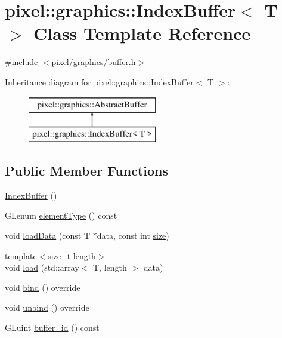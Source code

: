 \hypertarget{classpixel_1_1graphics_1_1_index_buffer}{}\section{pixel\+:\+:graphics\+:\+:Index\+Buffer$<$ T $>$ Class Template Reference}
\label{classpixel_1_1graphics_1_1_index_buffer}


{\ttfamily \#include $<$pixel/graphics/buffer.\+h$>$}

Inheritance diagram for pixel\+:\+:graphics\+:\+:Index\+Buffer$<$ T $>$\+:\begin{figure}[H]
\begin{center}
\leavevmode
\includegraphics[height=2.000000cm]{classpixel_1_1graphics_1_1_index_buffer}
\end{center}
\end{figure}
\subsection*{Public Member Functions}
\begin{DoxyCompactItemize}
\item 
\hyperlink{classpixel_1_1graphics_1_1_index_buffer_ac5e5c987e447ff151b794a9b61940a29}{Index\+Buffer} ()
\item 
G\+Lenum \hyperlink{classpixel_1_1graphics_1_1_index_buffer_afd886afe46f7ec109902a4ff40ef2f24}{element\+Type} () const
\item 
void \hyperlink{classpixel_1_1graphics_1_1_index_buffer_aef55496774e132eb2deac595165e3576}{load\+Data} (const T $\ast$data, const int \hyperlink{namespacepixel_a465745e3b1a334686475c629948876f0}{size})
\item 
{\footnotesize template$<$size\+\_\+t length$>$ }\\void \hyperlink{classpixel_1_1graphics_1_1_index_buffer_a77168f7b0643fb6dd336108d2498eca9}{load} (std\+::array$<$ T, length $>$ data)
\item 
void \hyperlink{classpixel_1_1graphics_1_1_index_buffer_a70b8fdbdd19c8800e005425712426bde}{bind} () override
\item 
void \hyperlink{classpixel_1_1graphics_1_1_index_buffer_a5a90a44db73a048c76cf0fade5867621}{unbind} () override
\item 
G\+Luint \hyperlink{classpixel_1_1graphics_1_1_index_buffer_a6c02db9641270ccfbd77ddba3fc4e4d5}{buffer\+\_\+id} () const
\end{DoxyCompactItemize}
